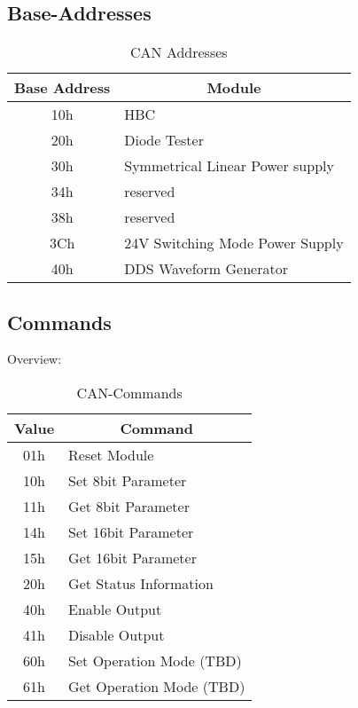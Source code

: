 \subsection{Base-Addresses}
\begin{table}[H]
    \centering
    \begin{tabular}{|c|l|}
        \hline
        \textbf{Base Address}   &   \multicolumn{1}{|c|}{\textbf{Module}}\\ \hline \hline
        10h    &   HBC    \\ \hline
        20h    &   Diode Tester \\ \hline
        30h    &   Symmetrical Linear Power supply \\ \hline
        34h    &   reserved \\ \hline
        38h    &   reserved \\ \hline
        3Ch    &   24V Switching Mode Power Supply \\\hline
        40h    &   DDS Waveform Generator \\ \hline
    \end{tabular}
    \caption{CAN Addresses}
    \label{tab:CAN-ADD}
\end{table}

\newpage

\subsection{Commands}
Overview:
\begin{table}[H]
    \centering
    \begin{tabular}{|c|l|}
        \hline
        \textbf{Value}   &   \multicolumn{1}{|c|}{\textbf{Command}}\\ \hline \hline \hline
        01h    &   Reset Module \\ \hline

        \hline
        10h    &   Set 8bit Parameter    \\ \hline
        11h    &   Get 8bit Parameter     \\ \hline
        14h    &   Set 16bit Parameter   \\ \hline
        15h    &   Get 16bit Parameter    \\ \hline 
        \hline
        20h    &   Get Status Information \\ \hline 
        \hline
        40h    &   Enable Output       \\ \hline
        41h    &   Disable Output      \\ \hline 
        \hline
        60h    &   Set Operation Mode  (TBD)\\ \hline
        61h    &   Get Operation Mode  (TBD)\\ \hline 
    \end{tabular}
    \caption{CAN-Commands}
\label{tab:CAN-Commands}
\end{table}

